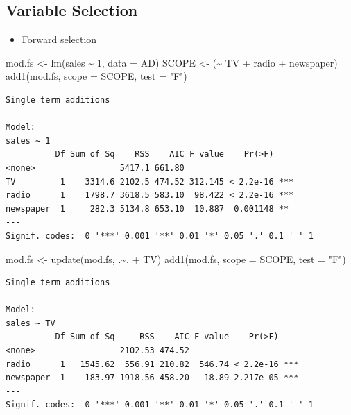 \documentclass[
]{article}
\newenvironment{Shaded}{\begin{snugshade}}{\end{snugshade}}
\newcommand{\AttributeTok}[1]{\textcolor[rgb]{0.77,0.63,0.00}{#1}}
\newcommand{\DecValTok}[1]{\textcolor[rgb]{0.00,0.00,0.81}{#1}}
\newcommand{\FunctionTok}[1]{\textcolor[rgb]{0.00,0.00,0.00}{#1}}
\newcommand{\NormalTok}[1]{#1}
\newcommand{\OtherTok}[1]{\textcolor[rgb]{0.56,0.35,0.01}{#1}}
\newcommand{\SpecialCharTok}[1]{\textcolor[rgb]{0.00,0.00,0.00}{#1}}
\newcommand{\StringTok}[1]{\textcolor[rgb]{0.31,0.60,0.02}{#1}}
\providecommand{\tightlist}{%
  \setlength{\itemsep}{0pt}\setlength{\parskip}{0pt}}
\begin{document}
\hypertarget{variable-selection}{%
\subsection{Variable Selection}\label{variable-selection}}

\begin{itemize}
\tightlist
\item
  Forward selection
\end{itemize}

\begin{Shaded}
\begin{Highlighting}[]
\NormalTok{mod.fs }\OtherTok{\textless{}{-}} \FunctionTok{lm}\NormalTok{(sales }\SpecialCharTok{\textasciitilde{}} \DecValTok{1}\NormalTok{, }\AttributeTok{data =}\NormalTok{ AD)}
\NormalTok{SCOPE }\OtherTok{\textless{}{-}}\NormalTok{ (}\SpecialCharTok{\textasciitilde{}}\NormalTok{ TV }\SpecialCharTok{+}\NormalTok{ radio }\SpecialCharTok{+}\NormalTok{ newspaper)}
\FunctionTok{add1}\NormalTok{(mod.fs, }\AttributeTok{scope =}\NormalTok{ SCOPE, }\AttributeTok{test =} \StringTok{"F"}\NormalTok{)}
\end{Highlighting}
\end{Shaded}

\begin{verbatim}
Single term additions

Model:
sales ~ 1
          Df Sum of Sq    RSS    AIC F value    Pr(>F)    
<none>                 5417.1 661.80                      
TV         1    3314.6 2102.5 474.52 312.145 < 2.2e-16 ***
radio      1    1798.7 3618.5 583.10  98.422 < 2.2e-16 ***
newspaper  1     282.3 5134.8 653.10  10.887  0.001148 ** 
---
Signif. codes:  0 '***' 0.001 '**' 0.01 '*' 0.05 '.' 0.1 ' ' 1
\end{verbatim}

\begin{Shaded}
\begin{Highlighting}[]
\NormalTok{mod.fs }\OtherTok{\textless{}{-}} \FunctionTok{update}\NormalTok{(mod.fs, .}\SpecialCharTok{\textasciitilde{}}\NormalTok{. }\SpecialCharTok{+}\NormalTok{ TV)}
\FunctionTok{add1}\NormalTok{(mod.fs, }\AttributeTok{scope =}\NormalTok{ SCOPE, }\AttributeTok{test =} \StringTok{"F"}\NormalTok{)}
\end{Highlighting}
\end{Shaded}

\begin{verbatim}
Single term additions

Model:
sales ~ TV
          Df Sum of Sq     RSS    AIC F value    Pr(>F)    
<none>                 2102.53 474.52                      
radio      1   1545.62  556.91 210.82  546.74 < 2.2e-16 ***
newspaper  1    183.97 1918.56 458.20   18.89 2.217e-05 ***
---
Signif. codes:  0 '***' 0.001 '**' 0.01 '*' 0.05 '.' 0.1 ' ' 1
\end{verbatim}
\end{document}
